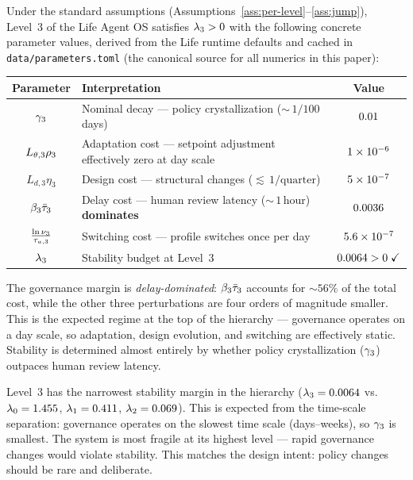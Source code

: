 \documentclass[11pt,a4paper]{article}
\begin{document}
\begin{proposition}
\label{prop:governance}
Under the standard assumptions (Assumptions~\ref{ass:per-level}--\ref{ass:jump}),
Level~3 of the Life Agent OS satisfies $\lambda_3 > 0$ with the following
concrete parameter values, derived from the Life runtime defaults and
cached in \texttt{data/parameters.toml} (the canonical source for all
numerics in this paper):
\begin{center}
\begin{tabular}{@{}cp{6.8cm}c@{}}
  \toprule
  \textbf{Parameter} & \textbf{Interpretation} & \textbf{Value} \\
  \midrule
  $\gamma_3$ & Nominal decay --- policy crystallization
    (${\sim}\,1/100$ days) & $0.01$ \\
  $L_{\theta,3} \rho_3$ & Adaptation cost --- setpoint adjustment
    effectively zero at day scale & $1 \times 10^{-6}$ \\
  $L_{d,3} \eta_3$ & Design cost --- structural changes
    (${\lesssim}\,1/\text{quarter}$) & $5 \times 10^{-7}$ \\
  $\beta_3 \bar{\tau}_3$ & Delay cost --- human review latency
    (${\sim}\,1\,\text{hour}$) \textbf{dominates} & $0.0036$ \\
  $\frac{\ln \nu_3}{\taua[3]}$ & Switching cost --- profile switches
    once per day & $5.6 \times 10^{-7}$ \\
  \midrule
  $\lambda_3$ & Stability budget at Level~3
    & $0.0064 > 0\;\checkmark$ \\
  \bottomrule
\end{tabular}
\end{center}
The governance margin is \emph{delay-dominated}: $\beta_3 \bar{\tau}_3$
accounts for ${\sim}56\%$ of the total cost, while the other three
perturbations are four orders of magnitude smaller.  This is the expected
regime at the top of the hierarchy --- governance operates on a day
scale, so adaptation, design evolution, and switching are effectively
static.  Stability is determined almost entirely by whether policy
crystallization ($\gamma_3$) outpaces human review latency.
\end{proposition}

\begin{remark}
\label{rem:narrowest}
Level~3 has the narrowest stability margin in the hierarchy
($\lambda_3 = 0.0064$ vs.\ $\lambda_0 = 1.455$,
$\lambda_1 = 0.411$, $\lambda_2 = 0.069$).
This is expected from the time-scale separation: governance operates on
the slowest time scale (days--weeks), so $\gamma_3$ is smallest.  The
system is most fragile at its highest level --- rapid governance changes
would violate stability.  This matches the design intent: policy changes
should be rare and deliberate.
\end{remark}
\end{document}
